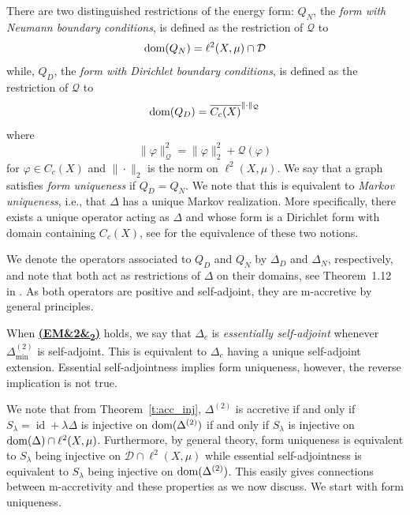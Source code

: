 \documentclass[letterpaper]{article}
\theoremstyle{definition}
\theoremstyle{named}
\numberwithin{equation}{section}
\newcommand{\EM}[1][]{\hyperlink{ass:EM}{\textup{\textbf{(EM\ifx&#1&\else\textsubscript{#1}\fi)}}}}
\newcommand{\Q}{\mathcal{Q}}
\newcommand{\QD}{Q_{D}}
\newcommand{\QN}{Q_{N}}
\newcommand{\D}{\mathcal{D}}
\newcommand{\lm}{\lambda}
\newcommand{\dom}{\textnormal{dom}} %
\newcommand{\id}{\operatorname{id}}
\begin{document}
There are two distinguished restrictions of the energy form: $\QN$, the \emph{form
with Neumann boundary conditions}, is defined
as the restriction of $\Q$ to
$$\dom(\QN) = \ell^2(X,\mu) \cap \D$$
while, $\QD$, the \emph{form with Dirichlet boundary conditions}, 
is defined as the restriction of $\Q$ to
$$\dom(\QD) = \overline{C_c(X)}^{\| \cdot \|_\Q}$$
where
$$\| \varphi \|_\Q^2 = \|\varphi\|_2^2 + \Q(\varphi)$$
for $\varphi \in C_c(X)$ and $\| \cdot \|_2$ is the norm on $\ell^2(X,\mu)$.
We say that a graph satisfies \emph{form uniqueness} if $\QD=\QN$.
We note that this is equivalent to \emph{Markov uniqueness}, i.e., that $\Delta$
has a unique Markov realization. More specifically, there exists a
unique operator acting
as $\Delta$ and whose form is a Dirichlet form with domain
containing $C_c(X)$, see \cite{Sch20, Sch20b, keller2021graphs}
for the equivalence of these two notions.

We denote the operators associated to $\QD$ and $\QN$
by $\Delta_{D}$ and $\Delta_{N}$, respectively, and note that
both act as restrictions of $\Delta$ on their domains, see Theorem~1.12 in \cite{keller2021graphs}.
As both operators
are positive and self-adjoint, they are m-accretive by general principles.

When \EM[2] holds, we 
say
that $\Delta_c$ is \emph{essentially self-adjoint} whenever $\Delta_{\min}^{(2)}$ is self-adjoint.
This is equivalent to $\Delta_c$ having a unique self-adjoint extension.
Essential self-adjointness implies form uniqueness, however, the reverse implication is not true. 



We note that from Theorem~\ref{t:acc_inj}, $\Delta^{(2)}$ is accretive if and only if $S_\lm=\id +\lm \Delta$ is injective
on $\dom(\Delta^{(2)})$ if and only if $S_\lm$ is injective on $\dom(\Delta) \cap \ell^2(X,\mu)$. Furthermore,
by general theory, form uniqueness is equivalent to $S_\lm$ being injective on $\D \cap \ell^2(X,\mu)$ while essential
self-adjointness is
equivalent to $S_\lm$ being injective on $\dom(\Delta^{(2)})$.
This easily gives connections between m-accretivity and these properties as we now discuss.
We start with form uniqueness.
\end{document}
